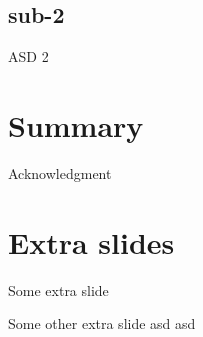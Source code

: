 \documentclass[aspectratio=169]{beamer}
\begin{document}
\subsection{sub-2}
\begin{frame}{ASD 2}
\end{frame}

\section{Summary}

\begin{frame}{Acknowledgment}
    
\end{frame}

\section*{Extra slides} %
\begin{frame}{Some extra slide}
\end{frame}
{
    \begin{frame}{Some other extra slide}
        asd asd
    \end{frame}
}
\end{document}
